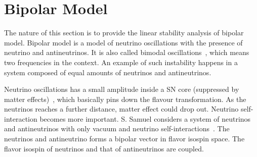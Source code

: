 




\section{\label{chap:app-sec:bipolar}Bipolar Model}

The nature of this section is to provide the linear stability analysis of bipolar model. Bipolar model is a model of neutrino oscillations with the presence of neutrino and antineutrinos. It is also called bimodal oscillations~\cite{Samuel1996}, which means two frequencies in the context. An example of such instability happens in a system composed of equal amounts of neutrinos and antineutrinos.


Neutrino oscillations has a small amplitude inside a SN core (suppressed by matter effects)~\cite{wolf78}, which basically pins down the flavour transformation. As the neutrinos reaches a further distance, matter effect could drop out. Neutrino self-interaction becomes more important. S. Samuel considers a system of neutrinos and antineutrinos with only vacuum and neutrino self-interactions~\cite{Samuel1996}. The neutrinos and antineutrino forms a bipolar vector in flavor isospin space. The flavor isospin of neutrinos and that of antineutrinos are coupled.






